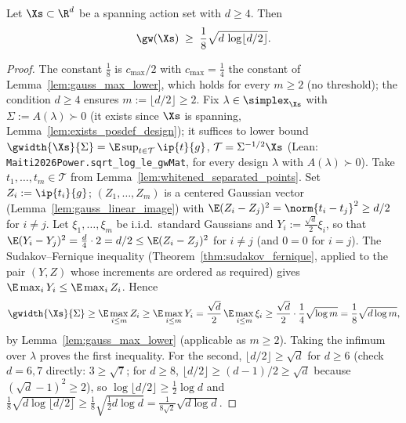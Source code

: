 \begin{proposition}\label{prop:width_lower_sqrt_dlogd}
\leanok
{}
Let $\Xs \subset \R^d$ be a spanning action set with $d \ge 4$. Then
\[
  \gw(\Xs) \;\ge\; \frac18\sqrt{d\,\log\lfloor d/2\rfloor} .
\]
\end{proposition}

\begin{proof}
\leanok
{}
The constant $\frac18$ is $c_{\max}/2$ with $c_{\max} = \frac14$ the constant of
Lemma~\ref{lem:gauss_max_lower}, which holds for every $m \ge 2$ (no threshold); the
condition $d \ge 4$ ensures $m := \lfloor d/2\rfloor \ge 2$.
Fix $\lambda \in \simplex_{\Xs}$ with $\Sigma := A(\lambda) \succ 0$ (it exists since $\Xs$ is
spanning, Lemma~\ref{lem:exists_posdef_design}); it suffices to lower bound
$\gwidth{\Xs}{\Sigma} = \E\sup_{t\in\mathcal T}\ip{t}{g}$, $\mathcal T = \Sigma^{-1/2}\Xs$
(Lean: \texttt{Maiti2026Power.sqrt\_log\_le\_gwMat}, for every design $\lambda$ with $A(\lambda)\succ0$).
Take $t_1,\dots,t_m \in \mathcal T$ from
Lemma~\ref{lem:whitened_separated_points}. Set $Z_i := \ip{t_i}{g}$; $(Z_1,\dots,Z_m)$ is a
centered Gaussian vector (Lemma~\ref{lem:gauss_linear_image}) with
$\E(Z_i - Z_j)^2 = \norm{t_i-t_j}^2 \ge d/2$ for $i \ne j$. Let $\xi_1,\dots,\xi_m$ be
i.i.d.\ standard Gaussians and $Y_i := \frac{\sqrt d}{2}\xi_i$, so that
$\E(Y_i-Y_j)^2 = \frac{d}{4}\cdot 2 = d/2 \le \E(Z_i-Z_j)^2$ for $i\ne j$ (and $0 = 0$ for
$i = j$). The Sudakov--Fernique inequality (Theorem~\ref{thm:sudakov_fernique}, applied to the
pair $(Y, Z)$ whose increments are ordered as required) gives
$\E\max_i Y_i \le \E\max_i Z_i$. Hence
\[
  \gwidth{\Xs}{\Sigma} \ge \E\max_{i\le m}Z_i \ge \E\max_{i\le m}Y_i
  = \frac{\sqrt d}{2}\,\E\max_{i\le m}\xi_i \ge \frac{\sqrt d}{2}\cdot\frac14\sqrt{\log m}
  = \frac18\sqrt{d\log m},
\]
by Lemma~\ref{lem:gauss_max_lower} (applicable as $m \ge 2$). Taking the infimum over
$\lambda$ proves the first inequality. For the second, $\lfloor d/2\rfloor \ge \sqrt d$ for
$d \ge 6$ (check $d = 6, 7$ directly: $3 \ge \sqrt 7$; for $d\ge 8$,
$\lfloor d/2\rfloor \ge (d-1)/2 \ge \sqrt d$ because $(\sqrt d - 1)^2 \ge 2$), so
$\log\lfloor d/2\rfloor \ge \frac12\log d$ and
$\frac18\sqrt{d\log\lfloor d/2\rfloor} \ge \frac18\sqrt{\tfrac12 d\log d} = \frac{1}{8\sqrt2}\sqrt{d\log d}$.
\end{proof}

